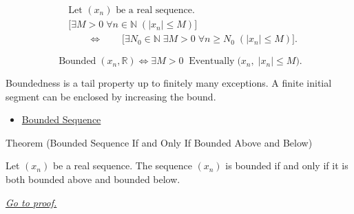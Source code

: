 \begin{remark*}
\[
\begin{aligned}
&\text{Let } (x_n) \text{ be a real sequence.}\\
&\bigl[
\exists M > 0\;
\forall n \in \mathbb{N}\;(|x_n| \le M)
\bigr]\\
&\qquad\Longleftrightarrow\qquad
\bigl[
\exists N_0 \in \mathbb{N}\;
\exists M > 0\;
\forall n \ge N_0\;(|x_n| \le M)
\bigr].
\end{aligned}
\]
\end{remark*}

\begin{remark*}
\[
\operatorname{Bounded}(x_n,\mathbb{R})
\Longleftrightarrow
\exists M > 0\;
\operatorname{Eventually}\bigl(x_n,\; |x_n| \le M\bigr).
\]
\end{remark*}

\begin{remark*}[Interpretation]
Boundedness is a tail property up to finitely many exceptions. A finite
initial segment can be enclosed by increasing the bound.
\end{remark*}

\begin{dependencies}
\begin{itemize}
  \item \hyperref[def:bounded-sequence]{Bounded Sequence}
\end{itemize}
\end{dependencies}


\begin{theorembox}{Theorem (Bounded Sequence If and Only If Bounded Above and Below)}
\begin{theorem}
\label{thm:bounded-sequence-bounded-above-below}
Let $(x_n)$ be a real sequence. The sequence $(x_n)$ is bounded if and only
if it is both bounded above and bounded below.

\smallskip
\noindent
\hyperref[prf:bounded-sequence-bounded-above-below]{\textit{Go to proof.}}
\end{theorem}
\end{theorembox}

